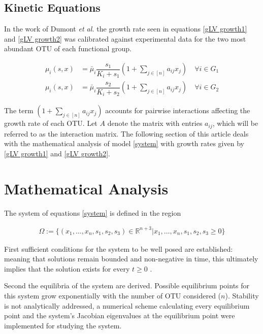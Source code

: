 \documentclass[3p,times]{elsarticle}
\newcommand{\R}{\mathbb{R}}
\begin{document}
\subsection{Kinetic Equations}
In the work of Dumont \textit{et al.} \cite{Dumont2016} the growth rate seen in equations \eqref{gLV growth1} and \eqref{gLV growth2} was calibrated against experimental data for the two most abundant OTU of each functional group.

\begin{align}
\label{gLV growth1}\mu_i(s,x) &= \bar{\mu}_i \dfrac{s_1}{K_i + s_1}\left(1+\sum \limits_{j\in [n]} a_{ij} x_{j} \right) \quad \forall i \in G_1 \\
\label{gLV growth2}\mu_i(s,x) &= \bar{\mu}_i \dfrac{s_2}{K_i + s_2}\left(1+\sum \limits_{j\in [n]} a_{ij} x_{j} \right) \quad \forall i \in G_2 
\end{align}

The term $\left(1+\sum \limits_{j\in [n]} a_{ij} x_{j} \right)$ accounts for pairwise interactions affecting the growth rate of each OTU. Let $A$ denote the matrix
with entries $a_{ij}$, which will be referred to as the interaction matrix. The following section of this article deals with the mathematical analysis of model \eqref{system} with growth rates given by \eqref{gLV growth1} and \eqref{gLV growth2}.

\section{Mathematical Analysis}

The system of equations \eqref{system} is defined in the region 

\begin{align*}
\Omega := \{ (x_1,\dots,x_n,s_1,s_2,s_3)\in  \R^{n+3} | x_1,\dots,x_n,s_1,s_2,s_3  \geq 0  \}
\end{align*}

First sufficient conditions for the system to be well posed are established: meaning that solutions remain bounded and non-negative in time, this ultimately implies that the solution exists for every $t \geq 0$ \cite{Khalil1996}. 

Second the equilibria of the system are derived. Possible equilibrium points for this system grow exponentially with the number of OTU considered ($n$).  Stability is not analytically addressed, a numerical scheme calculating every equilibrium point and the system's Jacobian eigenvalues at the equilibrium point were implemented for studying the system. 
\end{document}
